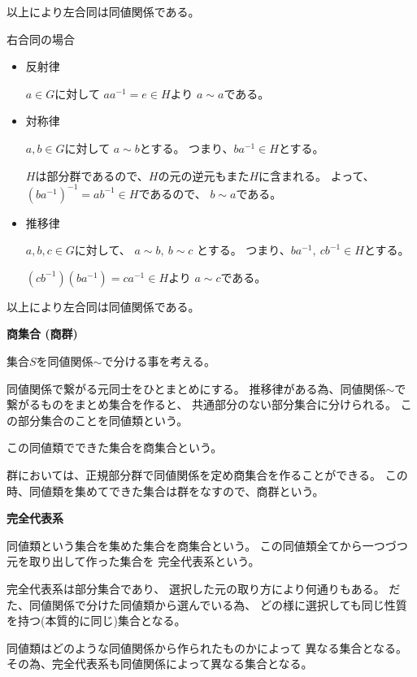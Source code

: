 \documentclass[12pt,b5paper]{ltjsarticle}
\begin{document}
以上により左合同は同値関係である。


右合同の場合

\begin{itemize}
 \item
      反射律

      $a\in G$に対して
      $aa^{-1} = e \in H$より
      $a\sim a$である。

 \item
      対称律

      $a,b\in G$に対して
      $a \sim b$とする。
      つまり、$ba^{-1}\in H$とする。

      $H$は部分群であるので、$H$の元の逆元もまた$H$に含まれる。
      よって、
      $(ba^{-1})^{-1} = ab^{-1}\in H$であるので、
      $b\sim a$である。

 \item
      推移律

      $a,b,c\in G$に対して、
      $a\sim b, \: b\sim c$
      とする。
      つまり、$ba^{-1} , \: cb^{-1} \in H$とする。

      $(cb^{-1})(ba^{-1}) = ca^{-1} \in H$より
      $a\sim c$である。
\end{itemize}

以上により左合同は同値関係である。


\hrulefill

\textbf{商集合 (商群)}

集合$S$を同値関係$\sim$で分ける事を考える。

同値関係で繋がる元同士をひとまとめにする。
推移律がある為、同値関係$\sim$で繋がるものをまとめ集合を作ると、
共通部分のない部分集合に分けられる。
この部分集合のことを同値類という。

この同値類でできた集合を商集合という。


群においては、正規部分群で同値関係を定め商集合を作ることができる。
この時、同値類を集めてできた集合は群をなすので、商群という。

\hrulefill

\textbf{完全代表系}

同値類という集合を集めた集合を商集合という。
この同値類全てから一つづつ元を取り出して作った集合を
完全代表系という。

完全代表系は部分集合であり、
選択した元の取り方により何通りもある。
だた、同値関係で分けた同値類から選んでいる為、
どの様に選択しても同じ性質を持つ(本質的に同じ)集合となる。


同値類はどのような同値関係から作られたものかによって
異なる集合となる。
その為、完全代表系も同値関係によって異なる集合となる。
\end{document}
